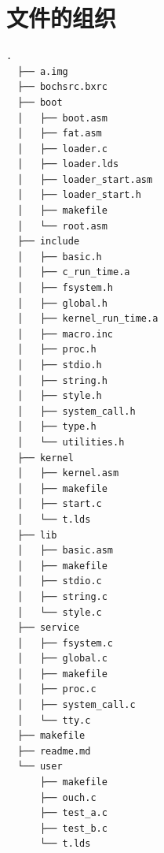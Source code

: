 \documentclass[forprint]{WHUBachelor}
\begin{document}
\chapter{文件的组织}
\label{code:organization}
\begin{lstlisting}[language={[x86masm]Assembler}]
  .
  ├── a.img
  ├── bochsrc.bxrc
  ├── boot
  │   ├── boot.asm
  │   ├── fat.asm
  │   ├── loader.c
  │   ├── loader.lds
  │   ├── loader_start.asm
  │   ├── loader_start.h
  │   ├── makefile
  │   └── root.asm
  ├── include
  │   ├── basic.h
  │   ├── c_run_time.a
  │   ├── fsystem.h
  │   ├── global.h
  │   ├── kernel_run_time.a
  │   ├── macro.inc
  │   ├── proc.h
  │   ├── stdio.h
  │   ├── string.h
  │   ├── style.h
  │   ├── system_call.h
  │   ├── type.h
  │   └── utilities.h
  ├── kernel
  │   ├── kernel.asm
  │   ├── makefile
  │   ├── start.c
  │   └── t.lds
  ├── lib
  │   ├── basic.asm
  │   ├── makefile
  │   ├── stdio.c
  │   ├── string.c
  │   └── style.c
  ├── service
  │   ├── fsystem.c
  │   ├── global.c
  │   ├── makefile
  │   ├── proc.c
  │   ├── system_call.c
  │   └── tty.c
  ├── makefile
  ├── readme.md
  └── user
      ├── makefile
      ├── ouch.c
      ├── test_a.c
      ├── test_b.c
      └── t.lds
\end{lstlisting}

\cleardoublepage
\end{document}
